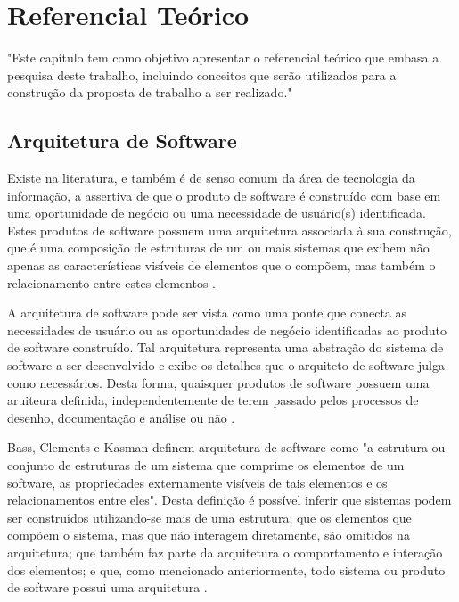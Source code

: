 \chapter[Referencial Teórico]{Referencial Teórico}

"Este capítulo tem como objetivo apresentar o referencial teórico que embasa a pesquisa deste trabalho, incluindo conceitos que serão utilizados para a construção da proposta de trabalho a ser realizado."

\section{Arquitetura de Software}
Existe na literatura, e também é de senso comum da área de tecnologia da informação, a assertiva de que o produto de software é construído com base em uma oportunidade de negócio ou uma necessidade de usuário(s) identificada. Estes produtos de software possuem uma arquitetura associada à sua construção, que é uma composição de estruturas de um ou mais sistemas que exibem não apenas as características visíveis de elementos que o compõem, mas também o relacionamento entre estes elementos \cite{bass_software_archi_practice_2003}.

A arquitetura de software pode ser vista como uma ponte que conecta as necessidades de usuário ou as oportunidades de negócio identificadas ao produto de software construído. Tal arquitetura representa uma abstração do sistema de software a ser desenvolvido e exibe os detalhes que o arquiteto de software julga como necessários. Desta forma, quaisquer produtos de software possuem uma aruiteura definida, independentemente de terem passado pelos processos de desenho, documentação e análise ou não \cite{bass_software_archi_practice_2003}.

Bass, Clements e Kasman\cite{bass_software_archi_practice_2003} definem arquitetura de software como "a estrutura ou conjunto de estruturas de um sistema que comprime os elementos de um software, as propriedades externamente visíveis de tais elementos e os relacionamentos entre eles". Desta definição é possível inferir que sistemas podem ser construídos utilizando-se mais de uma estrutura; que os elementos que compõem o sistema, mas que não interagem diretamente, são omitidos na arquitetura; que também faz parte da arquitetura o comportamento e interação dos elementos; e que, como mencionado anteriormente, todo sistema ou produto de software possui uma arquitetura \cite{bass_software_archi_practice_2003}.

